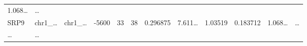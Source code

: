\documentclass[
]{article}
\begin{document}
\begin{longtable}[]{@{}llllllllllll@{}}
\begin{minipage}[t]{0.09\columnwidth}
1.068\ldots{}\strut
\end{minipage} & \begin{minipage}[t]{0.02\columnwidth}\raggedright
\ldots{}\strut
\end{minipage}\tabularnewline
\begin{minipage}[t]{0.06\columnwidth}\raggedright
SRP9\strut
\end{minipage} & \begin{minipage}[t]{0.06\columnwidth}\raggedright
chr1\_\ldots{}\strut
\end{minipage} & \begin{minipage}[t]{0.06\columnwidth}\raggedright
chr1\_\ldots{}\strut
\end{minipage} & \begin{minipage}[t]{0.06\columnwidth}\raggedright
-5600\strut
\end{minipage} & \begin{minipage}[t]{0.06\columnwidth}\raggedright
33\strut
\end{minipage} & \begin{minipage}[t]{0.06\columnwidth}\raggedright
38\strut
\end{minipage} & \begin{minipage}[t]{0.06\columnwidth}\raggedright
0.296875\strut
\end{minipage} & \begin{minipage}[t]{0.08\columnwidth}\raggedright
7.611\ldots{}\strut
\end{minipage} & \begin{minipage}[t]{0.06\columnwidth}\raggedright
1.03519\strut
\end{minipage} & \begin{minipage}[t]{0.06\columnwidth}\raggedright
0.183712\strut
\end{minipage} & \begin{minipage}[t]{0.09\columnwidth}\raggedright
1.068\ldots{}\strut
\end{minipage} & \begin{minipage}[t]{0.02\columnwidth}\raggedright
\ldots{}\strut
\end{minipage}\tabularnewline
\begin{minipage}[t]{0.06\columnwidth}\raggedright
\ldots{}\strut
\end{minipage} & \begin{minipage}[t]{0.06\columnwidth}\raggedright
\ldots{}\strut
\end{minipage} & \begin{minipage}[t]{0.06\columnwidth}\raggedright

\end{minipage}
\end{longtable}
\end{document}

